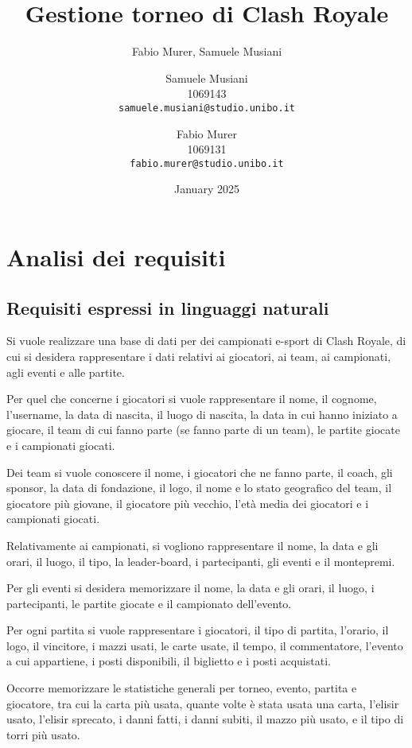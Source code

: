 \documentclass{article}
\title{\textbf{Gestione torneo di Clash Royale}}
\author{Fabio Murer, Samuele Musiani}
\author{
  Samuele Musiani \\
  1069143 \\
  \texttt{samuele.musiani@studio.unibo.it}
  \and
  Fabio Murer\\
  1069131\\
  \texttt{fabio.murer@studio.unibo.it}
}
\date{January 2025}
\begin{document}
\maketitle

\section{Analisi dei requisiti}

\subsection{Requisiti espressi in linguaggi naturali}
Si vuole realizzare una base di dati per dei campionati e-sport di Clash Royale, di cui si desidera rappresentare i dati relativi ai giocatori, ai team, ai campionati, agli eventi e alle partite.

Per quel che concerne i giocatori si vuole rappresentare il nome, il cognome, l'username, la data di nascita, il luogo di nascita, la data in cui hanno iniziato a giocare, il team di cui fanno parte (se fanno parte di un team), le partite giocate e i campionati giocati.

Dei team si vuole conoscere il nome, i giocatori che ne fanno parte, il coach, gli sponsor, la data di fondazione, il logo, il nome e lo stato geografico del team, il giocatore più giovane, il giocatore più vecchio, l'età media dei giocatori e i campionati giocati.

Relativamente ai campionati, si vogliono rappresentare il nome, la data e gli orari, il luogo, il tipo, la leader-board, i partecipanti, gli eventi e il montepremi.

Per gli eventi si desidera memorizzare il nome, la data e gli orari, il luogo, i partecipanti, le partite giocate e il campionato dell'evento.

Per ogni partita si vuole rappresentare i giocatori, il tipo di partita, l'orario, il logo, il vincitore, i mazzi usati, le carte usate, il tempo, il commentatore, l'evento a cui appartiene, i posti disponibili, il biglietto e i posti acquistati.

Occorre memorizzare le statistiche generali per torneo, evento, partita e giocatore, tra cui la carta più usata, quante volte è stata usata una carta, l'elisir usato, l'elisir sprecato, i danni fatti, i danni subiti, il mazzo più usato, e il tipo di torri più usato. 
\end{document}
